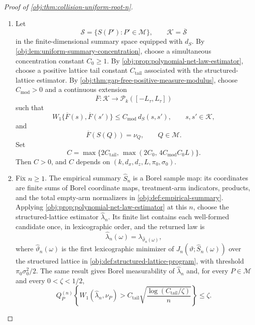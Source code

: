 \begin{proof}[Proof of \cref{obj:thm:collision-uniform-root-n}]
\begin{enumerate}
\item Let
\[
\mathscr S=\{S(P'):P'\in\mathcal M\},
\qquad
\mathcal K=\overline{\mathscr S}
\]
in the finite-dimensional summary space equipped with \(d_S\).  By
\cref{obj:lem:uniform-summary-concentration}, choose a simultaneous
concentration constant \(C_0\ge 1\).  By
\cref{obj:prop:polynomial-net-law-estimator}, choose a positive lattice
tail constant \(C_{\mathrm{tail}}\) associated with the structured-lattice
estimator.  By \cref{obj:thm:gap-free-positive-measure-modulus}, choose
\(C_{\mathrm{mod}}>0\) and a continuous extension
\[
\overline F:\mathcal K\to \mathcal P_k([-L_\tau,L_\tau])
\]
such that
\[
W_1\{\overline F(s),\overline F(s')\}
\le
C_{\mathrm{mod}}\,d_S(s,s'),
\qquad s,s'\in\mathcal K,
\]
and
\[
\overline F(S(Q))=\nu_Q,
\qquad Q\in\mathcal M .
\]
Set
\[
C=
\max\{2C_{\mathrm{tail}},\,
      \max(2C_0,\,4C_{\mathrm{mod}}C_0L)\}.
\]
Then \(C>0\), and \(C\) depends on
\((k,d_x,d_z,L,\pi_0,\sigma_0)\).%

\item Fix \(n\ge1\).  The empirical summary \(\widehat S_n\) is a Borel
sample map: its coordinates are finite sums of Borel coordinate maps,
treatment-arm indicators, products, and the total empty-arm normalizers in
\cref{obj:def:empirical-summary}.  Applying
\cref{obj:prop:polynomial-net-law-estimator} at this \(n\), choose the
structured-lattice estimator \(\widehat\lambda_n\).  Its finite list contains
each well-formed candidate once, in lexicographic order, and the returned law is
\[
\widehat\lambda_n(\omega)=\lambda_{\widehat\vartheta_n(\omega)},
\]
where \(\widehat\vartheta_n(\omega)\) is the first lexicographic minimizer of
\(J_n(\vartheta;\widehat S_n(\omega))\) over the structured lattice in
\cref{obj:def:structured-lattice-program}, with threshold
\(\pi_0\sigma_0^2/2\).  The same result gives Borel measurability of
\(\widehat\lambda_n\) and, for every \(P\in\mathcal M\) and every
\(0<\zeta<1/2\),
\[
Q_P^{(n)}
\left\{
W_1(\widehat\lambda_n,\nu_P)>
C_{\mathrm{tail}}
\sqrt{\frac{\log(C_{\mathrm{tail}}/\zeta)}{n}}
\right\}
\le \zeta .
\]%


\end{enumerate}
\end{proof}
